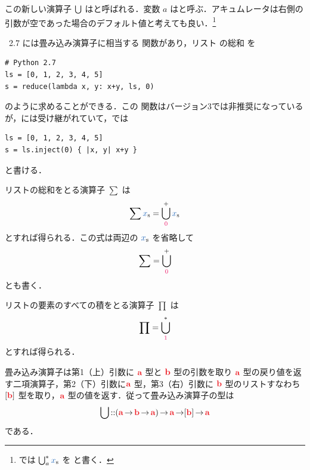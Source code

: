 \documentclass[a5paper,twoside,fleqn,draft]{jsbook}
\begin{document}
この新しい演算子 $\operatorname*{\bigcup}$ はと呼ばれる．変数 $a$ はと呼ぶ．アキュムレータは右側の引数が空であった場合のデフォルト値と考えても良い．\footnote{\haskell では $\hFold^*_a\hListVar{x}$ を  と書く．}

\python\ 2.7 には畳み込み演算子に相当する  関数があり，リスト  の総和  を
\begin{pythoncode}
\begin{verbatim}
# Python 2.7
ls = [0, 1, 2, 3, 4, 5]
s = reduce(lambda x, y: x+y, ls, 0)
\end{verbatim}
\end{pythoncode}
のように求めることができる．この  関数は\python バージョン3では非推奨になっているが，\ruby には受け継がれていて，\ruby では
\begin{rubycode}
\begin{verbatim}
ls = [0, 1, 2, 3, 4, 5]
s = ls.inject(0) { |x, y| x+y }
\end{verbatim}
\end{rubycode}
と書ける．

リストの総和をとる演算子 $\sum$ は
\begin{equation}
  \sum\hListVar{x}
  =\hFold^+_{\hConstant{0}}\hListVar{x}
\end{equation}
とすれば得られる．この式は両辺の $\hListVar{x}$ を省略して
\begin{equation}
  \sum
  =\hFold^+_{\hConstant{0}}
\end{equation}
とも書く．

リストの要素のすべての積をとる演算子 $\prod$ は
\begin{equation}
  \prod
  =\hFold^*_{\hConstant{1}}
\end{equation}
とすれば得られる．

畳み込み演算子は第1（上）引数に $\hTypeName{a}$ 型と $\hTypeName{b}$ 型の引数を取り $\hTypeName{a}$ 型の戻り値を返す二項演算子，第2（下）引数に$\hTypeName{a}$ 型，第3（右）引数に $\hTypeName{b}$ 型のリストすなわち$[\hTypeName{b}]$ 型を取り，$\hTypeName{a}$ 型の値を返す．従って畳み込み演算子の型は
\begin{equation}
  \hFold
  \hIsTypeOf(\hTypeName{a}\hFunctionArrow\hTypeName{b}\hFunctionArrow\hTypeName{a})
  \hFunctionArrow\hTypeName{a}
  \hFunctionArrow[\hTypeName{b}]
  \hFunctionArrow\hTypeName{a}
\end{equation}
である．
\end{document}
